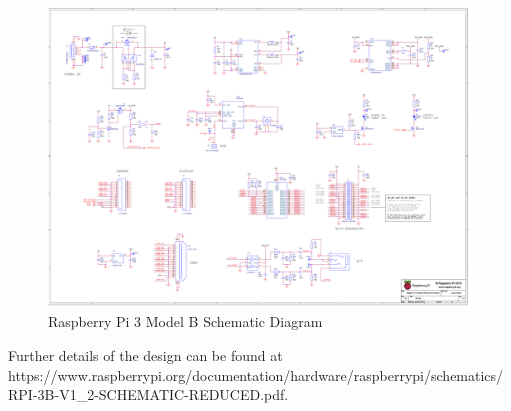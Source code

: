 \begin{figure}[H]
	\centering
	\includegraphics[width=1.25\linewidth,angle=90,origin=c]{RPI-3B.pdf}
	\caption{Raspberry Pi 3 Model B Schematic Diagram \cite{rpi3hardware}}
	\label{rpi3bschematic}
\end{figure}

Further details of the design can be found at \\ https://www.raspberrypi.org/documentation/hardware/raspberrypi/schematics/RPI-3B-V1\_2-SCHEMATIC-REDUCED.pdf.